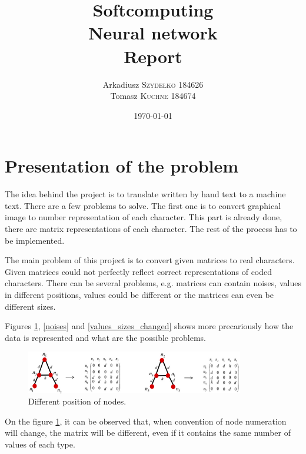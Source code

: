 \documentclass[a4paper, 11pt]{article}
\title{Softcomputing \\ Neural network \\ Report} %
\author{Arkadiusz \textsc{Szydełko} 184626 \\ Tomasz \textsc{Kuchne} 184674} %
\date{\today} %
\begin{document}
\maketitle %



\section{Presentation of the problem}
\label{problem_presentation}
The idea behind the project is to translate written by hand text to a machine text. There are a few problems to solve. The first one is to convert graphical image to number representation of each character. This part is already done, there are matrix representations of each character. The rest of the process has to be implemented.
 
The main problem of this project is to convert given matrices to real characters. Given matrices could not perfectly reflect correct representations of coded characters. There can be several problems, e.g. matrices can contain noises, values in different positions, values could be different or the matrices can even be different sizes.

Figures \ref{nodes_changed}, \ref{noises} and \ref{values_sizes_changed} shows more precariously how the data is represented and what are the possible problems.

\begin{figure}[h]
\begin{center}
\includegraphics[width=0.85\textwidth]{images/nodes}
\caption{Different position of nodes.}
\label{nodes_changed}
\end{center}
\end{figure}

On the figure \ref{nodes_changed}, it can be observed that, when convention of node numeration will change, the matrix will be different, even if it contains the same number of values of each type. 
\end{document}
